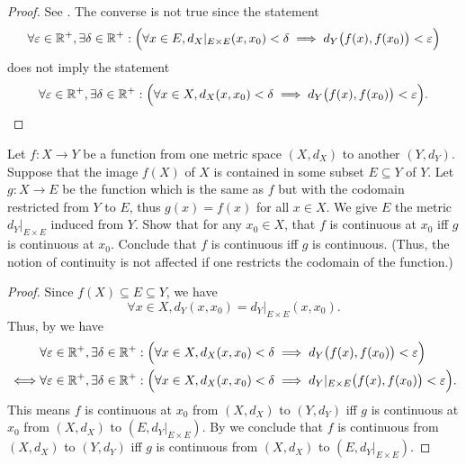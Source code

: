 \begin{proof}
  See .
  The converse is not true since the statement
  \[
    \forall \varepsilon \in \mathbb{R}^+, \exists \delta \in \mathbb{R}^+ : \Big(\forall x \in E, d_X|_{E \times E}(x, x_0) < \delta \implies d_Y\big(f(x), f(x_0)\big) < \varepsilon\Big)
  \]
  does not imply the statement
  \[
    \forall \varepsilon \in \mathbb{R}^+, \exists \delta \in \mathbb{R}^+ : \Big(\forall x \in X, d_X(x, x_0) < \delta \implies d_Y\big(f(x), f(x_0)\big) < \varepsilon\Big).
  \]
\end{proof}

\begin{ex}\label{ii:ex:2.1.7}
  Let \(f : X \to Y\) be a function from one metric space \((X, d_X)\) to another \((Y, d_Y)\).
  Suppose that the image \(f(X)\) of \(X\) is contained in some subset \(E \subseteq Y\) of \(Y\).
  Let \(g : X \to E\) be the function which is the same as \(f\) but with the codomain restricted from \(Y\) to \(E\), thus \(g(x) = f(x)\) for all \(x \in X\).
  We give \(E\) the metric \(d_Y|_{E \times E}\) induced from \(Y\).
  Show that for any \(x_0 \in X\), that \(f\) is continuous at \(x_0\) iff \(g\) is continuous at \(x_0\).
  Conclude that \(f\) is continuous iff \(g\) is continuous.
  (Thus, the notion of continuity is not affected if one restricts the codomain of the function.)
\end{ex}

\begin{proof}
  Since \(f(X) \subseteq E \subseteq Y\), we have
  \[
    \forall x \in X, d_Y(x, x_0) = d_Y|_{E \times E}(x, x_0).
  \]
  Thus, by  we have
  \begin{align*}
         & \forall \varepsilon \in \mathbb{R}^+, \exists \delta \in \mathbb{R}^+ : \Big(\forall x \in X, d_X(x, x_0) < \delta \implies d_Y\big(f(x), f(x_0)\big) < \varepsilon\Big)                \\
    \iff & \forall \varepsilon \in \mathbb{R}^+, \exists \delta \in \mathbb{R}^+ : \Big(\forall x \in X, d_X(x, x_0) < \delta \implies d_Y|_{E \times E}\big(f(x), f(x_0)\big) < \varepsilon\Big).
  \end{align*}
  This means \(f\) is continuous at \(x_0\) from \((X, d_X)\) to \((Y, d_Y)\) iff \(g\) is continuous at \(x_0\) from \((X, d_X)\) to \((E, d_Y|_{E \times E})\).
  By  we conclude that \(f\) is continuous from \((X, d_X)\) to \((Y, d_Y)\) iff \(g\) is continuous from \((X, d_X)\) to \((E, d_Y|_{E \times E})\).
\end{proof}
